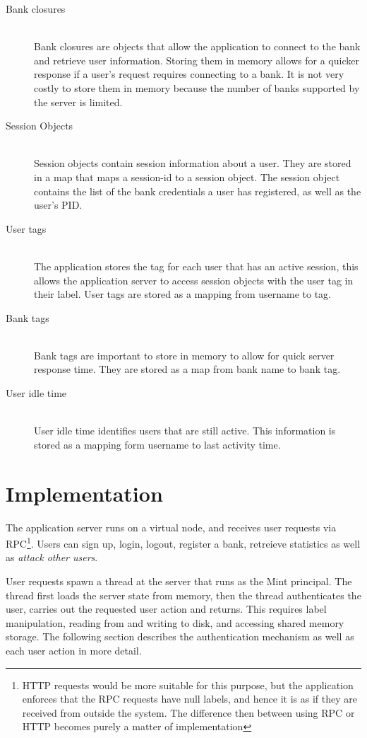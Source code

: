 \begin{description}
  \item[Bank closures] \ \\
    Bank closures are objects that allow the application to connect to the bank 
    and retrieve user information. Storing them in memory allows for a quicker 
    response if a user's request requires connecting to a bank. It is not very 
    costly to store them in memory because the number of banks supported by 
    the server is limited. 
  \item[Session Objects] \ \\
    Session objects contain session information about a user. They are stored in a
    map that maps a session-id to a session object. The session object contains 
    the list of the bank credentials a user has registered, as well as the 
    user's PID.
  \item[User tags] \ \\
    The application stores the tag for each user that has an active session, this
    allows the application server to access session objects with the user tag in 
    their label. User tags are stored as a mapping from username to tag.
  \item[Bank tags] \ \\
    Bank tags are important to store in memory to allow for quick server 
    response time. They are stored as a map from bank name to bank tag.
  \item[User idle time] \ \\
    User idle time identifies users that are still active. This information is 
    stored as a mapping form username to last activity time.
\end{description}

\section{Implementation}

The application server runs on a virtual node, and receives user requests via RPC\footnote{HTTP requests would be more suitable for this purpose, but the application enforces that the RPC requests have null labels, and hence it is as if they are received from outside the system. The difference then between using RPC or HTTP becomes purely a matter of implementation}. 
Users can sign up, login, logout, register a bank, retreieve statistics as well as \emph{attack other users}.

User requests spawn a thread at the server that runs as the Mint principal. The thread first loads the server state from memory, then the thread authenticates the user, carries out the requested user action and returns. This requires label manipulation, reading from and writing to disk, and accessing shared memory storage. The following section describes the authentication mechanism as well as each user action in more detail.


